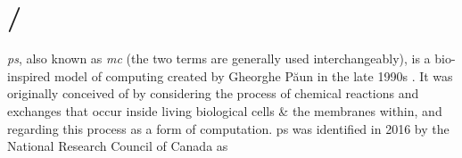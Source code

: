 \section{/}


\emph{\Gls{ps}}, also known as \emph{\gls{mc}} (the two terms are generally used interchangeably), is a bio-inspired model of computing created by Gheorghe Păun in the late 1990s \cite{tPaun98a,Paun2000}.  It was originally conceived of by considering the process of chemical reactions and exchanges that occur inside living biological cells \& the membranes within, and regarding this process as a form of computation.  \Gls{ps} was identified in 2016 by the National Research Council of Canada as 

